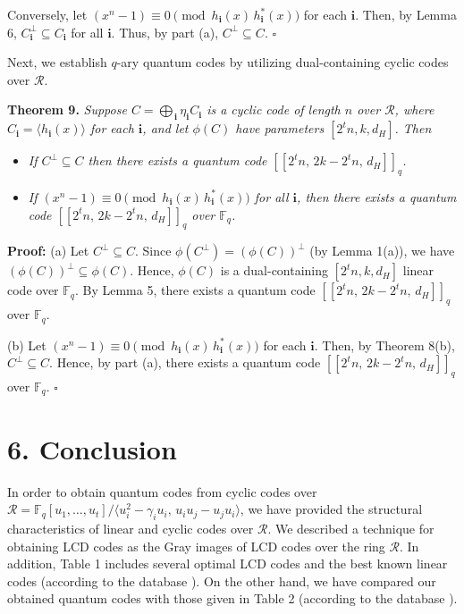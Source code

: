 \documentclass[12pt]{article}
\begin{document}
Conversely, let $(x^n - 1) \equiv 0 \pmod{h_{\mathbf{i}}(x)\, h_{\mathbf{i}}^*(x)}$ for each $\mathbf{i}$. Then, by Lemma 6, $C_{\mathbf{i}}^{\perp} \subseteq C_{\mathbf{i}}$ for all $\mathbf{i}$. Thus, by part (a), $C^{\perp} \subseteq C$. \hfill $\square$

\medskip
Next, we establish $q$-ary quantum codes by utilizing dual-containing cyclic codes over $\mathcal{R}$.

\medskip
\noindent
\textbf{Theorem 9.} \textit{Suppose $C = \bigoplus_{\,\mathbf{i}} \eta_{\mathbf{i}} C_{\mathbf{i}}$ is a cyclic code of length $n$ over $\mathcal{R}$, where $C_{\mathbf{i}} = \langle h_{\mathbf{i}}(x) \rangle$ for each $\mathbf{i}$, and let $\phi(C)$ have parameters $[2^t n, k, d_H]$. Then}
\begin{itemize}
    \item[(a)] \textit{If $C^{\perp} \subseteq C$ then there exists a quantum code $[[2^t n,\, 2k - 2^t n,\, d_H]]_q$.}
    \item[(b)] \textit{If $(x^n - 1) \equiv 0 \pmod{h_{\mathbf{i}}(x)\, h_{\mathbf{i}}^*(x)}$ for all $\mathbf{i}$, then there exists a quantum code $[[2^t n,\, 2k - 2^t n,\, d_H]]_q$ over $\mathbb{F}_q$.}
\end{itemize}

\noindent
\textbf{Proof:} (a) Let $C^{\perp} \subseteq C$. Since $\phi(C^{\perp}) = (\phi(C))^{\perp}$ (by Lemma 1(a)), we have $(\phi(C))^{\perp} \subseteq \phi(C)$. Hence, $\phi(C)$ is a dual-containing $[2^t n, k, d_H]$ linear code over $\mathbb{F}_q$. By Lemma 5, there exists a quantum code $[[2^t n,\, 2k - 2^t n,\, d_H]]_q$ over $\mathbb{F}_q$.

(b) Let $(x^n - 1) \equiv 0 \pmod{h_{\mathbf{i}}(x)\, h_{\mathbf{i}}^*(x)}$ for each $\mathbf{i}$. Then, by Theorem 8(b), $C^{\perp} \subseteq C$. Hence, by part (a), there exists a quantum code $[[2^t n,\, 2k - 2^t n,\, d_H]]_q$ over $\mathbb{F}_q$. \hfill $\square$

\section*{6. Conclusion}
In order to obtain quantum codes from cyclic codes over $\mathcal{R} = \mathbb{F}_q[u_1,\ldots,u_t]/\langle u_i^2 - \gamma_i u_i,\, u_i u_j - u_j u_i \rangle$, we have provided the structural characteristics of linear and cyclic codes over $\mathcal{R}$. We described a technique for obtaining LCD codes as the Gray images of LCD codes over the ring $\mathcal{R}$. In addition, Table 1 includes several optimal LCD codes and the best known linear codes (according to the database \cite{ref23}). On the other hand, we have compared our obtained quantum codes with those given in Table 2 (according to the database \cite{ref14}).
\end{document}
